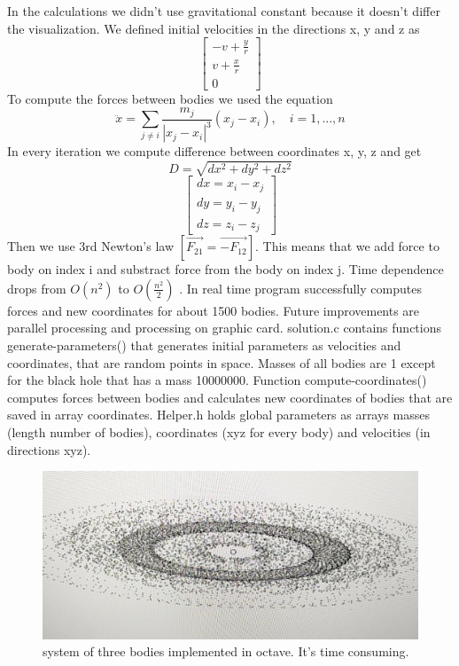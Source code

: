 \documentclass[A4]{article}
\begin{document}
\newline
In the calculations we didn't use gravitational constant because it doesn't differ the visualization. We defined initial velocities in the directions x, y and z as 
\[
	\begin{bmatrix} 
    	-v+\frac{y}{r} \\
	v+\frac{x}{r} \\
	0
	\end{bmatrix}
\]  
\newline
To compute the forces between bodies we used the equation 
\[
\ddot{x} = \sum_{j \neq i}\frac{m_j}{|x_j - x_i|^3}(x_j - x_i), \quad i = 1, . . . , n
\]
\newline
In every iteration we compute difference between coordinates x, y, z and get 
\[
D = \sqrt{dx^2 + dy^2 + dz^2}
\]
\newline
\[
\begin{bmatrix} 
    	dx = x_i - x_j \\
	dy = y_i - y_j \\
	dz = z_i - z_j
	\end{bmatrix}
\]
\newline
Then we use 3rd Newton's law $[\vec{F_{21}} = \vec{-F_{12}}]$. This means that we add force to body on index i and substract force from the body on index j. Time dependence drops from $O(n^2)$ to $O(\frac{n^2}{2})$ .
\newline \newline
In real time program successfully computes forces and new coordinates for about 1500 bodies. Future improvements are parallel processing and processing on graphic card. 
\newline
solution.c contains functions generate-parameters() that generates initial parameters as velocities and coordinates, that are random points in space. Masses of all bodies are 1 except for the black hole that has a mass 10000000. Function compute-coordinates() computes forces between bodies and calculates new coordinates of bodies that are saved in array coordinates. Helper.h holds global parameters as arrays masses (length number of bodies), coordinates (xyz for every body) and velocities (in directions xyz).
\begin{figure}[t!]
\centering
\includegraphics[width=\textwidth]{three_bodies_octave}
\caption{system of three bodies implemented in octave. It's time consuming.}
\end{figure}
\end{document}
